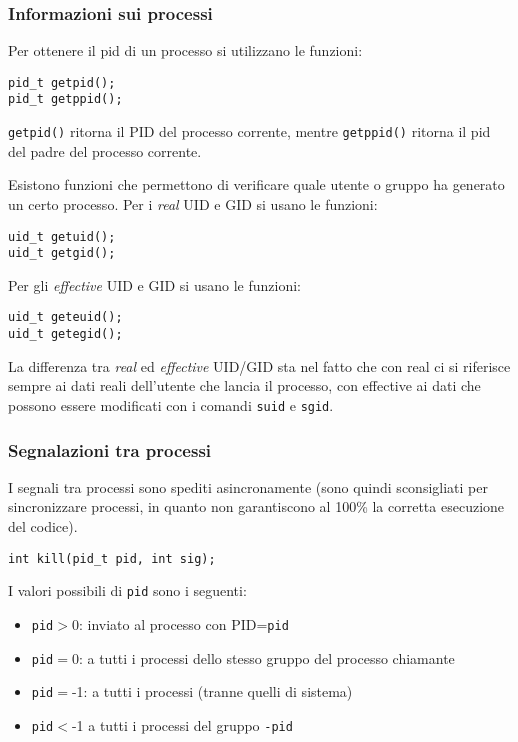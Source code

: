 \documentclass[a4paper, 10pt]{article}
\begin{document}
\subsubsection{Informazioni sui processi}
Per ottenere il pid di un processo si utilizzano le funzioni:
\begin{verbatim}
pid_t getpid();
pid_t getppid();
\end{verbatim}

\verb|getpid()| ritorna il PID del processo corrente, mentre \verb|getppid()| ritorna il pid del padre del processo corrente.

Esistono funzioni che permettono di verificare quale utente o gruppo ha generato un certo processo.
Per i \textit{real} UID e GID si usano le funzioni:
\begin{verbatim}
uid_t getuid();
uid_t getgid();
\end{verbatim}
Per gli \textit{effective} UID e GID si usano le funzioni:
\begin{verbatim}
uid_t geteuid();
uid_t getegid();
\end{verbatim}

La differenza tra \textit{real} ed \textit{effective} UID/GID sta nel fatto che con real ci si riferisce sempre ai dati reali dell'utente che lancia il processo, con effective ai dati che possono essere modificati con i comandi \verb|suid| e \verb|sgid|.

\subsubsection{Segnalazioni tra processi}
I segnali tra processi sono spediti asincronamente (sono quindi sconsigliati per sincronizzare processi, in quanto non garantiscono al 100\% la corretta esecuzione del codice).
\begin{verbatim}
int kill(pid_t pid, int sig);
\end{verbatim}
I valori possibili di \verb|pid| sono i seguenti:
\begin{itemize}
\item \verb|pid|$>$0: inviato al processo con PID=\verb|pid|
\item \verb|pid|$=$0: a tutti i processi dello stesso gruppo del processo chiamante
\item \verb|pid|$=$-1: a tutti i processi (tranne quelli di sistema)
\item \verb|pid|$<$-1 a tutti i processi del gruppo \verb|-pid|
\end{itemize}
\end{document}
